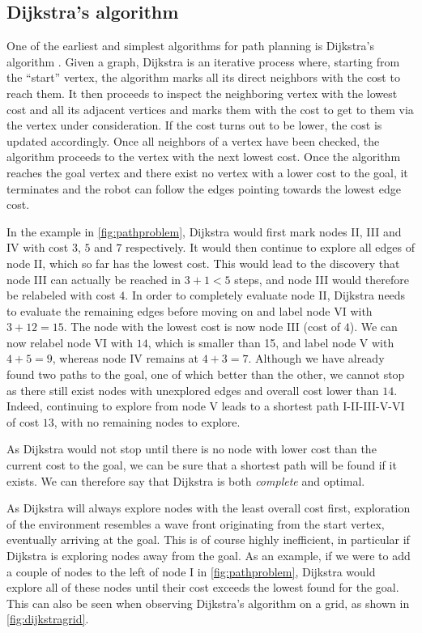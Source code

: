 \subsection{Dijkstra's algorithm}

One of the earliest and simplest algorithms for path planning is Dijkstra's algorithm \cite{dijkstra1959note}. Given a graph, Dijkstra is an iterative process where, starting from the ``start'' vertex, the algorithm marks all its direct neighbors with the cost to reach them. It then proceeds to inspect the neighboring vertex with the lowest cost and all its adjacent vertices and marks them with the cost to get to them via the vertex under consideration. If the cost turns out to be lower, the cost is updated accordingly. Once all neighbors of a vertex have been checked, the algorithm proceeds to the vertex with the next lowest cost. Once the algorithm reaches the goal vertex and there exist no vertex with a lower cost to the goal, it terminates and the robot can follow the edges pointing towards the lowest edge cost.

In the example in \cref{fig:pathproblem}, Dijkstra would first mark nodes II, III and IV with cost $3$, $5$ and $7$ respectively. It would then continue to explore all edges of node II, which so far has the lowest cost. This would lead to the discovery that node III can actually be reached in $3+1<5$ steps, and node III would therefore be relabeled with cost $4$. In order to completely evaluate node II, Dijkstra needs to evaluate the remaining edges before moving on and label node VI with $3+12=15$.
%
The node with the lowest cost is now node III (cost of $4$). We can now relabel node VI with $14$, which is smaller than 15, and label node V with $4+5=9$, whereas node IV remains at $4+3=7$. Although we have already found two paths to the goal, one of which better than the other, we cannot stop as there still exist nodes with unexplored edges and overall cost lower than $14$. Indeed, continuing to explore from node V leads to a shortest path I-II-III-V-VI of cost $13$, with no remaining nodes to explore.

As Dijkstra would not stop until there is no node with lower cost than the current cost to the goal, we can be sure that a shortest path will be found if it exists. We can therefore say that Dijkstra is both \textsl{complete} and optimal.

As Dijkstra will always explore nodes with the least overall cost first, exploration of the environment resembles a wave front originating from the start vertex, eventually arriving at the goal. This is of course highly inefficient, in particular if Dijkstra is exploring nodes away from the goal.
As an example, if we were to add a couple of nodes to the left of node I in \cref{fig:pathproblem}, Dijkstra would explore all of these nodes until their cost exceeds the lowest found for the goal. This can also be seen when observing Dijkstra's algorithm on a grid, as shown in \cref{fig:dijkstragrid}.

